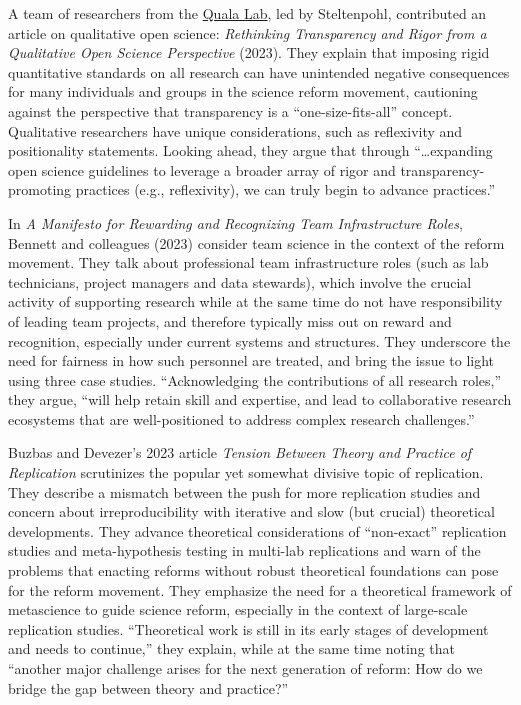 \documentclass[authordate, editorial,noabstract]{jote-new-article}
\begin{document}
A team of researchers from the \href{https://qualalab.org/}{Quala Lab}, led by Steltenpohl, contributed an article on qualitative open science: \emph{Rethinking Transparency and Rigor from a Qualitative Open Science Perspective} (2023). They explain that imposing rigid quantitative standards on all research can have unintended negative consequences for many individuals and groups in the science reform movement, cautioning against the perspective that transparency is a “one-size-fits-all” concept. Qualitative researchers have unique considerations, such as reflexivity and positionality statements. Looking ahead, they argue that through “…expanding open science guidelines to leverage a broader array of rigor and transparency-promoting practices (e.g., reflexivity), we can truly begin to advance practices.”



In \emph{A Manifesto for Rewarding and Recognizing Team Infrastructure Roles}, Bennett and colleagues (2023) consider team science in the context of the reform movement. They talk about professional team infrastructure roles (such as lab technicians, project managers and data stewards), which involve the crucial activity of supporting research while at the same time do not have responsibility of leading team projects, and therefore typically miss out on reward and recognition, especially under current systems and structures. They underscore the need for fairness in how such personnel are treated, and bring the issue to light using three case studies. “Acknowledging the contributions of all research roles,” they argue, “will help retain skill and expertise, and lead to collaborative research ecosystems that are well-positioned to address complex research challenges.”



Buzbas and Devezer's 2023 article \emph{Tension Between Theory and Practice of Replication} scrutinizes the popular yet somewhat divisive topic of replication. They describe a mismatch between the push for more replication studies and concern about irreproducibility with iterative and slow (but crucial) theoretical developments. They advance theoretical considerations of “non-exact” replication studies and meta-hypothesis testing in multi-lab replications and warn of the problems that enacting reforms without robust theoretical foundations can pose for the reform movement. They emphasize the need for a theoretical framework of metascience to guide science reform, especially in the context of large-scale replication studies. “Theoretical work is still in its early stages of development and needs to continue,” they explain, while at the same time noting that “another major challenge arises for the next generation of reform: How do we bridge the gap between theory and practice?”
\end{document}
